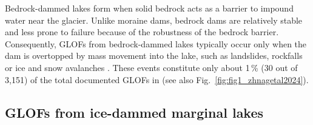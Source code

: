 
Bedrock-dammed lakes form when solid bedrock acts as a barrier to impound water near the glacier. Unlike moraine dams, bedrock dams are relatively stable and less prone to failure because of the robustness of the bedrock barrier. Consequently, GLOFs from bedrock-dammed lakes typically occur only when the dam is overtopped by mass movement into the lake, such as landslides, rockfalls or ice and snow avalanches \citep{Emmer2017, Huggel&al2004, Haeberli&al2017}. These events constitute only about 1\,\% (30 out of 3,151) of the total documented GLOFs in \cite{Lutzow&al2023} (see also Fig.~\ref{fig:fig1_zhnagetal2024}).


\subsection{GLOFs from ice-dammed marginal lakes}
\label{subsection:glofs_ice-dammed_lakes}

